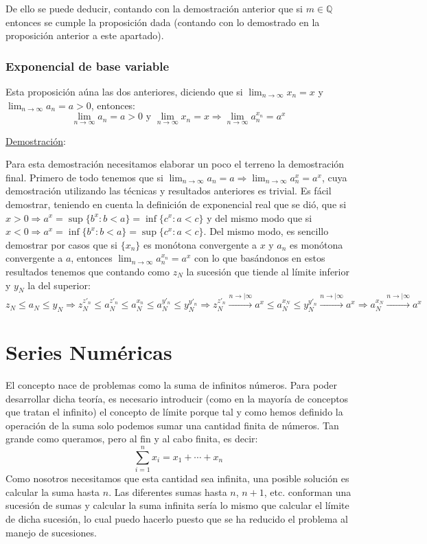 \documentclass[10pt,a4paper,openright]{book}
\theoremstyle{break}
\begin{document}
De ello se puede deducir, contando con la demostración anterior que si $m\in \mathbb Q$ entonces se cumple la proposición dada (contando con lo demostrado en la proposición anterior a este apartado).

\subsubsection{Exponencial de base variable}
Esta proposición aúna las dos anteriores, diciendo que si $\lim_{n\rightarrow \infty}x_n = x$ y $\lim_{n\rightarrow\infty}a_n=a>0$, entonces:
$$\lim_{n\rightarrow\infty}a_n=a>0 \mbox{ y } \lim_{n\rightarrow\infty}x_n=x\Rightarrow \lim_{n\rightarrow\infty}a_n^{x_n}=a^x$$

\underline{Demostración}:\par
Para esta demostración necesitamos elaborar un poco el terreno la demostración final. Primero de todo tenemos que si $\lim_{n\rightarrow \infty} a_n=a\Rightarrow \lim_{n\rightarrow \infty}a_n^x=a^x$, cuya demostración utilizando las técnicas y resultados anteriores es trivial. Es fácil demostrar, teniendo en cuenta la definición de exponencial real que se dió, que si $x>0\Rightarrow a^x=\sup\{b^x: b<a\}=\inf\{c^x: a<c\}$ y del mismo modo que si $x<0\Rightarrow a^x=\inf\{b^x: b<a\}=\sup\{c^x: a<c\}$. Del mismo modo, es sencillo demostrar por casos que si $\{x_n\}$ es monótona convergente a $x$ y $a_n$ es monótona convergente a $a$, entonces $\lim_{n\rightarrow\infty} a_n^{x_n}=a^x$ con lo que basándonos en estos resultados tenemos que contando como $z_N$ la sucesión que tiende al límite inferior y $y_N$ la del superior:
$$z_N\leq a_N\leq y_N\Rightarrow z_N^{z'_n}\leq a_N^{z'_n}\leq a_N^{x_n}\leq a_N^{y'_n}\leq y_N^{y'_n}\Rightarrow z_N^{z'_n}\xrightarrow{n\rightarrow|\infty}a^x\leq a_N^{x_N}\leq y_N^{y'_n}\xrightarrow{n\rightarrow|\infty}a^x\Rightarrow a_N^{x_N}\xrightarrow{n\rightarrow|\infty}a^x$$


\section{Series Numéricas}
El concepto nace de problemas como la suma de infinitos números. Para poder desarrollar dicha teoría, es necesario introducir (como en la mayoría de conceptos que tratan el infinito) el concepto de límite porque tal y como hemos definido la operación de la suma solo podemos sumar una cantidad finita de números. Tan grande como queramos, pero al fin y al cabo finita, es decir:
$$\sum_{i=1}^{n} x_i = x_1 + \cdots + x_n$$
Como nosotros necesitamos que esta cantidad sea infinita, una posible solución es calcular la suma hasta $n$. Las diferentes sumas hasta $n$, $n+1$, etc. conforman una sucesión de sumas y calcular la suma infinita sería lo mismo que calcular el límite de dicha sucesión, lo cual puedo hacerlo puesto que se ha reducido el problema al manejo de sucesiones.
\end{document}
